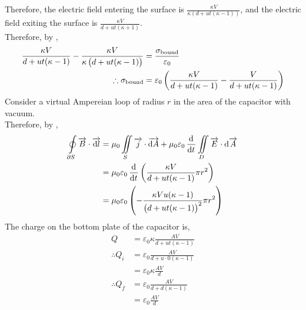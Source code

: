 \documentclass[fleqn, a4paper, 12pt, twoside]{article}
\theoremstyle{definition}
\theoremstyle{theorem}
\begin{document}
\begin{solution}
	Therefore, the electric field entering the surface is $\frac{\kappa V}{\kappa \left( d + u t (\kappa - 1) \right)}$, and the electric field exiting the surface is $\frac{\kappa V}{d + u t (\kappa + 1)}$.\\
	Therefore, by ,
	\begin{align*}
		\frac{\kappa V}{d + u t (\kappa - 1)} - \frac{\kappa V}{\kappa \left( d + u t (\kappa - 1) \right)} & = \frac{\sigma_{\textnormal{bound}}}{\varepsilon_0} \\
		\therefore \sigma_{\textnormal{bound}}                                                              & = \varepsilon_0 \left( \frac{\kappa V}{d + u t (\kappa - 1)} - \frac{V}{d + u t (\kappa - 1)} \right)
	\end{align*}
	Consider a virtual Ampereian loop of radius $r$ in the area of the capacitor with vacuum.\\
	Therefore, by ,
	\begin{align*}
		\oint\limits_{\partial S} \overrightarrow{B} \cdot \overrightarrow{\dif l} & = \mu_0 \iint\limits_{S} \overrightarrow{j} \cdot \overrightarrow{\dif A} + \mu_0 \varepsilon_0 \dod{}{t} \iint\limits_{D} \overrightarrow{E} \cdot \dif \overrightarrow{A} \\
                                                                                           & = \mu_0 \varepsilon_0 \dod{}{t}\left( \frac{\kappa V}{d + u t (\kappa - 1)} \pi r^2 \right)                                                                                 \\
                                                                                           & = \mu_0 \varepsilon_0 \left( -\frac{\kappa V u (\kappa - 1)}{\left( d + u t (\kappa - 1) \right)^2} \pi r^2 \right)
	\end{align*}
	The charge on the bottom plate of the capacitor is,
	\begin{align*}
		Q              & = \varepsilon_0 \kappa \frac{A V}{d + u t (\kappa - 1)} \\
		\therefore Q_i & = \varepsilon_0 \frac{A V}{d + u \cdot 0 (\kappa - 1)}  \\
                               & = \varepsilon_0 \kappa \frac{A V}{d}                    \\
		\therefore Q_f & = \varepsilon_0 \frac{A V}{d + d (\kappa - 1)}          \\
                               & = \varepsilon_0 \frac{A V}{d}
	\end{align*}

\end{solution}
\end{document}
